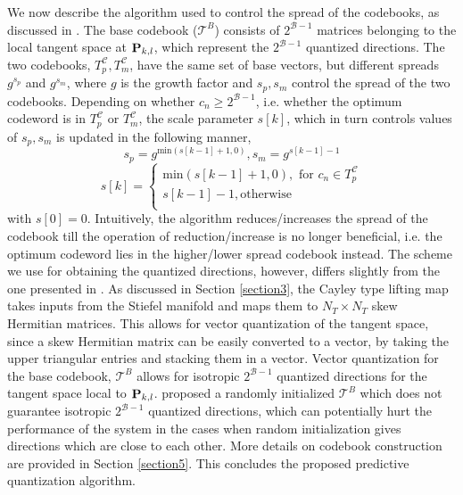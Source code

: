 \documentclass[conference]{IEEEtran}
\begin{document}
{We now describe the algorithm used to control the spread of the codebooks, as discussed in \cite{6891198}. The base codebook ($\mathcal{T}^B$) consists of
  $2^{\mathcal{B}-1}$ matrices belonging to the local tangent space at
  ${\bf P}_{k,l}$, which represent the $2^{\mathcal{B}-1}$ quantized directions. The two codebooks,
  $T^{\mathcal{C}}_p,T^{\mathcal{C}}_m$, have the same set of base
  vectors, but different spreads $g^{s_p}$ and $g^{s_m}$, where $g$ is
  the growth factor and $s_p,s_m$ control the spread of the two
  codebooks. Depending on whether $c_n \geq 2^{\mathcal{B}-1}$,
  i.e. whether the optimum codeword is in $T^{\mathcal{C}}_p$ or
  $T^{\mathcal{C}}_m$, the scale parameter $s[k]$, which in turn
  controls values of $s_p, s_m$ is updated in the following manner,
$$s_p=g^{\text{min}(s[k-1]+1,0)}, s_m = g^{s[k-1]-1}$$
$$
s[k]=
\begin{cases}
\text{min}(s[k-1]+1,0), \text{ for }c_n \in T^{\mathcal{C}}_p\\
s[k-1]-1, \text{otherwise}\\
\end{cases}
$$
with $s[0]=0$. Intuitively, the algorithm reduces/increases the spread
of the codebook till the operation of reduction/increase is no longer
beneficial, i.e. the optimum codeword lies in the higher/lower spread
codebook instead. The scheme we use for obtaining the quantized
directions, however, differs slightly from the one presented in
\cite{6891198}. As discussed in Section \ref{section3}, the Cayley
type lifting map takes inputs from the Stiefel manifold and maps them
to $N_T \times N_T$ skew Hermitian matrices. This allows for vector
quantization of the tangent space, since a skew Hermitian matrix can
be easily converted to a vector, by taking the upper triangular
entries and stacking them in a vector. Vector quantization for the
base codebook, $\mathcal{T}^B$ allows for isotropic $2^{\mathcal{B}-1}$ quantized
directions for the tangent space local to ${\bf P}_{k,l}$. \cite{6891198}
proposed a randomly initialized $\mathcal{T}^B$ which does not guarantee
isotropic $2^{\mathcal{B}-1}$ quantized directions, which can
potentially hurt the performance of the system in the cases when
random initialization gives directions which are close to each
other. More details on codebook construction are provided in Section
\ref{section5}. This concludes the proposed predictive quantization
algorithm.}
\end{document}
